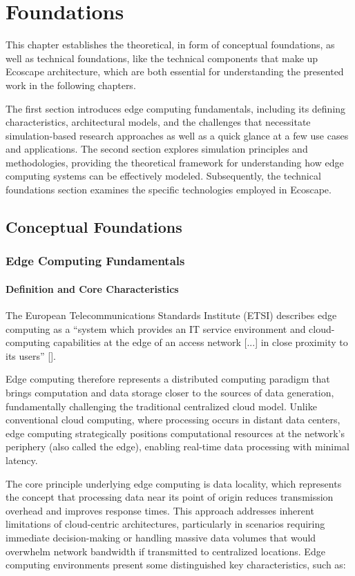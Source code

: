 \chapter{Foundations}
This chapter establishes the theoretical, in form of conceptual foundations, as well as technical foundations, like the technical components that make up Ecoscape architecture, 
which are both essential for understanding the presented work in the following chapters.

The first section introduces edge computing fundamentals, including its defining characteristics, architectural models, and the challenges that necessitate simulation-based research approaches as well as a quick glance at a few use cases and applications.
The second section explores simulation principles and methodologies, providing the theoretical framework for understanding how edge computing systems can be effectively modeled.
Subsequently, the technical foundations section examines the specific technologies employed in Ecoscape.
\section{Conceptual Foundations}
\subsection{Edge Computing Fundamentals}
\subsubsection{Definition and Core Characteristics}
The European Telecommunications Standards Institute (ETSI) describes edge computing as a ``system which provides an IT service environment and cloud-computing capabilities at the edge of an access network [...] in close proximity to its users'' [\cite{etsi_mec}].

Edge computing therefore represents a distributed computing paradigm that brings computation and data storage closer to the sources of data generation, fundamentally challenging the traditional centralized cloud model.
Unlike conventional cloud computing, where processing occurs in distant data centers, edge computing strategically positions computational resources at the network's periphery (also called the edge), enabling real-time data processing with minimal latency.

The core principle underlying edge computing is data locality, which represents the concept that processing data near its point of origin reduces transmission overhead and improves response times.
This approach addresses inherent limitations of cloud-centric architectures, particularly in scenarios requiring immediate decision-making or handling massive data volumes that would overwhelm network bandwidth if transmitted to centralized locations.
Edge computing environments present some distinguished key characteristics, such as:

